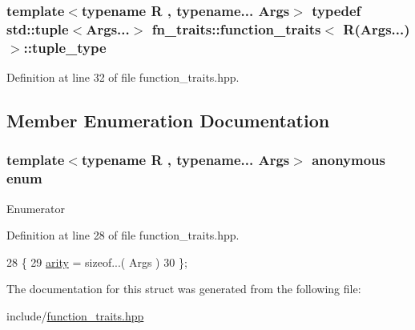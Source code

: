 \subsubsection[{\texorpdfstring{tuple\+\_\+type}{tuple_type}}]{\setlength{\rightskip}{0pt plus 5cm}template$<$typename R , typename... Args$>$ typedef std\+::tuple$<$Args...$>$ {\bf fn\+\_\+traits\+::function\+\_\+traits}$<$ R(Args...)$>$\+::{\bf tuple\+\_\+type}}\hypertarget{structfn__traits_1_1function__traits_3_01_r_07_args_8_8_8_08_4_a9b60ae8c79e52addf352e4ae7c8077b4}{}\label{structfn__traits_1_1function__traits_3_01_r_07_args_8_8_8_08_4_a9b60ae8c79e52addf352e4ae7c8077b4}


Definition at line 32 of file function\+\_\+traits.\+hpp.



\subsection{Member Enumeration Documentation}
\subsubsection[{\texorpdfstring{anonymous enum}{anonymous enum}}]{\setlength{\rightskip}{0pt plus 5cm}template$<$typename R , typename... Args$>$ anonymous enum}\hypertarget{structfn__traits_1_1function__traits_3_01_r_07_args_8_8_8_08_4_aafde9521d9646c97b984646d8273dd3b}{}\label{structfn__traits_1_1function__traits_3_01_r_07_args_8_8_8_08_4_aafde9521d9646c97b984646d8273dd3b}
\begin{Desc}
\item[Enumerator]\par
\begin{description}
\item[{\em 
arity\hypertarget{structfn__traits_1_1function__traits_3_01_r_07_args_8_8_8_08_4_aafde9521d9646c97b984646d8273dd3ba2f612b5524050ab8d6ab3d54d52dbbb0}{}\label{structfn__traits_1_1function__traits_3_01_r_07_args_8_8_8_08_4_aafde9521d9646c97b984646d8273dd3ba2f612b5524050ab8d6ab3d54d52dbbb0}
}]\end{description}
\end{Desc}


Definition at line 28 of file function\+\_\+traits.\+hpp.


\begin{DoxyCode}
28              \{
29             \hyperlink{structfn__traits_1_1function__traits_3_01_r_07_args_8_8_8_08_4_aafde9521d9646c97b984646d8273dd3ba2f612b5524050ab8d6ab3d54d52dbbb0}{arity} = \textcolor{keyword}{sizeof}...( Args )
30         \};
\end{DoxyCode}


The documentation for this struct was generated from the following file\+:\begin{DoxyCompactItemize}
\item 
include/\hyperlink{function__traits_8hpp}{function\+\_\+traits.\+hpp}\end{DoxyCompactItemize}
